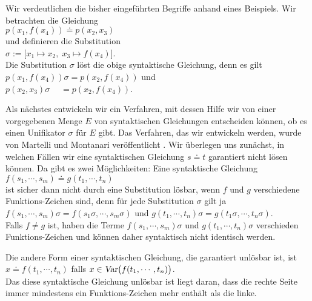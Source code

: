 \example
Wir verdeutlichen die bisher eingeführten Begriffe anhand eines Beispiels.  
Wir betrachten die Gleichung \\[0.2cm]
\hspace*{1.3cm} $p(x_1, f(x_4)) \doteq p( x_2, x_3)$ \\[0.2cm]
und definieren die Substitution \\[0.2cm]
\hspace*{1.3cm} $\sigma := \big[ x_1 \mapsto x_2,\; x_3 \mapsto f(x_4) \big]$. \\[0.2cm]
Die Substitution $\sigma$ löst die obige syntaktische Gleichung, denn es gilt \\[0.2cm]
\hspace*{1.3cm} $p(x_1, f(x_4))\sigma = p(x_2, f(x_4))$ \quad und \quad \\[0.2cm]
\hspace*{1.3cm} $p(x_2, x_3)\sigma \;\quad = p(x_2, f(x_4))$.  \eox


Als nächstes entwickeln wir ein Verfahren, mit dessen Hilfe wir von einer vorgegebenen
Menge $E$ von syntaktischen Gleichungen entscheiden können, ob es einen Unifikator $\sigma$ für $E$
gibt.  Das Verfahren, das wir entwickeln werden, wurde von Martelli und Montanari veröffentlicht
\cite{martelli:1982}.  
Wir überlegen uns zunächst, in welchen Fällen wir eine syntaktischen Gleichung $s \doteq t$
garantiert nicht lösen können.  Da gibt es zwei Möglichkeiten: Eine syntaktische Gleichung  \\[0.2cm]
\hspace*{1.3cm} $f(s_1,\cdots,s_m) \doteq g(t_1,\cdots, t_n)$ \\[0.2cm]
ist sicher dann nicht durch eine Substitution lösbar, wenn $f$ und $g$ verschiedene
Funktions-Zeichen sind, denn für jede Substitution $\sigma$ gilt ja \\[0.2cm]
\hspace*{1.0cm} $f(s_1,\cdots,s_m)\sigma = f(s_1\sigma,\cdots,s_m\sigma)$ \quad und \quad
                $g(t_1,\cdots, t_n)\sigma = g(t_1\sigma,\cdots,t_n\sigma)$. \\[0.2cm]
Falls $f \not = g$ ist, haben die Terme  $f(s_1,\cdots,s_m)\sigma$ und $g(t_1,\cdots, t_n)\sigma$ verschieden
Funktions-Zeichen und können daher syntaktisch nicht identisch werden.

Die andere Form einer syntaktischen Gleichung, die garantiert unlösbar ist, ist\\[0.2cm]
\hspace*{1.3cm} $x \doteq f(t_1,\cdots,t_n)$  \quad falls $x \in \textsl{Var}\big(f(t_1,\cdots,t_n)\big)$. \\[0.2cm]
Das diese syntaktische Gleichung unlösbar ist liegt daran, dass die rechte Seite immer mindestens ein
Funktions-Zeichen mehr enthält als die linke.  

